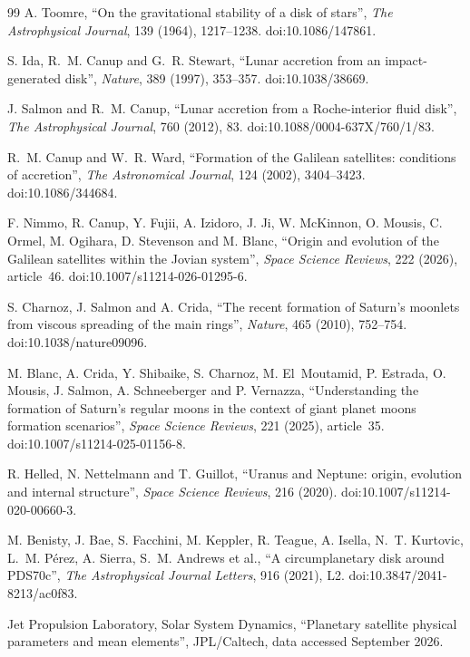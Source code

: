 \documentclass[11pt,a4paper,openany]{report}
\begin{document}
\begin{thebibliography}{99}
 A. Toomre, ``On the gravitational stability of a disk of stars'',
\emph{The Astrophysical Journal}, 139 (1964), 1217--1238. doi:10.1086/147861.

 S. Ida, R.~M. Canup and G.~R. Stewart, ``Lunar accretion from an impact-generated
disk'', \emph{Nature}, 389 (1997), 353--357. doi:10.1038/38669.

 J. Salmon and R.~M. Canup, ``Lunar accretion from a Roche-interior fluid
disk'', \emph{The Astrophysical Journal}, 760 (2012), 83. doi:10.1088/0004-637X/760/1/83.

 R.~M. Canup and W.~R. Ward, ``Formation of the Galilean satellites:
conditions of accretion'', \emph{The Astronomical Journal}, 124 (2002), 3404--3423.
doi:10.1086/344684.

 F. Nimmo, R. Canup, Y. Fujii, A. Izidoro, J. Ji, W. McKinnon, O. Mousis,
C. Ormel, M. Ogihara, D. Stevenson and M. Blanc, ``Origin and evolution of the Galilean satellites
within the Jovian system'', \emph{Space Science Reviews}, 222 (2026), article~46.
doi:10.1007/s11214-026-01295-6.

 S. Charnoz, J. Salmon and A. Crida, ``The recent formation of Saturn's
moonlets from viscous spreading of the main rings'', \emph{Nature}, 465 (2010), 752--754.
doi:10.1038/nature09096.

 M. Blanc, A. Crida, Y. Shibaike, S. Charnoz, M. El~Moutamid, P. Estrada,
O. Mousis, J. Salmon, A. Schneeberger and P. Vernazza, ``Understanding the formation of Saturn's
regular moons in the context of giant planet moons formation scenarios'', \emph{Space Science
Reviews}, 221 (2025), article~35. doi:10.1007/s11214-025-01156-8.

 R. Helled, N. Nettelmann and T. Guillot, ``Uranus and Neptune: origin,
evolution and internal structure'', \emph{Space Science Reviews}, 216 (2020).
doi:10.1007/s11214-020-00660-3.

 M. Benisty, J. Bae, S. Facchini, M. Keppler, R. Teague, A. Isella,
N.~T. Kurtovic, L.~M. Pérez, A. Sierra, S.~M. Andrews et al., ``A circumplanetary disk around
PDS70c'', \emph{The Astrophysical Journal Letters}, 916 (2021), L2. doi:10.3847/2041-8213/ac0f83.

 Jet Propulsion Laboratory, Solar System Dynamics, ``Planetary satellite physical
parameters and mean elements'', JPL/Caltech, data accessed September 2026.


\end{thebibliography}
\end{document}
